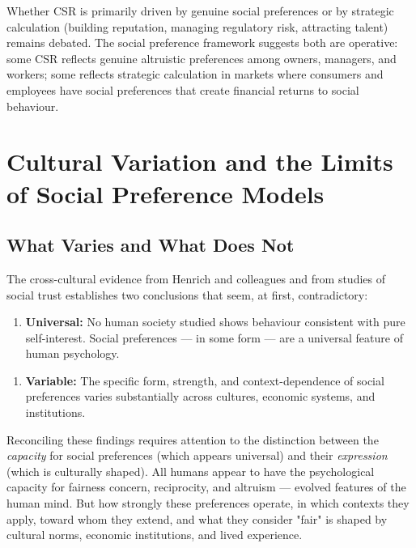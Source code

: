 \documentclass[12pt, letterpaper]{article}
\begin{document}
Whether CSR is primarily driven by genuine social preferences or by strategic calculation (building reputation, managing regulatory risk, attracting talent) remains debated. The social preference framework suggests both are operative: some CSR reflects genuine altruistic preferences among owners, managers, and workers; some reflects strategic calculation in markets where consumers and employees have social preferences that create financial returns to social behaviour.

\medskip


\section{Cultural Variation and the Limits of Social Preference Models}



\subsection{What Varies and What Does Not}


The cross-cultural evidence from Henrich and colleagues and from studies of social trust establishes two conclusions that seem, at first, contradictory:

\begin{enumerate}
\item \textbf{Universal:} No human society studied shows behaviour consistent with pure self-interest. Social preferences --- in some form --- are a universal feature of human psychology.
\end{enumerate}

\begin{enumerate}
\item \textbf{Variable:} The specific form, strength, and context-dependence of social preferences varies substantially across cultures, economic systems, and institutions.
\end{enumerate}

Reconciling these findings requires attention to the distinction between the \textit{capacity} for social preferences (which appears universal) and their \textit{expression} (which is culturally shaped). All humans appear to have the psychological capacity for fairness concern, reciprocity, and altruism --- evolved features of the human mind. But how strongly these preferences operate, in which contexts they apply, toward whom they extend, and what they consider "fair" is shaped by cultural norms, economic institutions, and lived experience.
\end{document}
